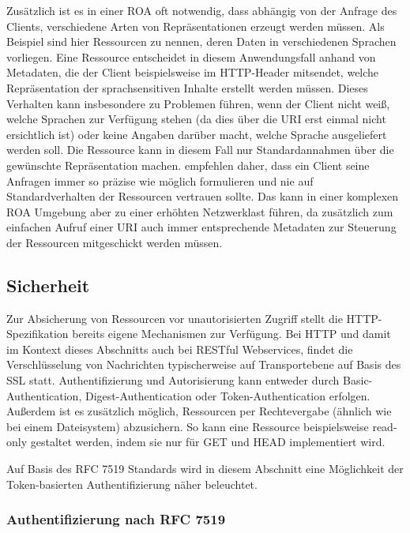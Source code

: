 Zusätzlich ist es in einer \ac{ROA} oft notwendig, dass abhängig von der Anfrage des Clients, verschiedene Arten von Repräsentationen erzeugt werden müssen. Als Beispiel sind hier Ressourcen zu nennen, deren Daten in verschiedenen Sprachen vorliegen. Eine Ressource entscheidet in diesem Anwendungsfall anhand von Metadaten, die der Client beispielsweise im HTTP-Header mitsendet, welche Repräsentation der sprachsensitiven Inhalte erstellt werden müssen. Dieses Verhalten kann insbesondere zu Problemen führen, wenn der Client nicht weiß, welche Sprachen zur Verfügung stehen (da dies über die \ac{URI} erst einmal nicht ersichtlich ist) oder keine Angaben darüber macht, welche Sprache ausgeliefert werden soll. Die Ressource kann in diesem Fall nur Standardannahmen über die gewünschte Repräsentation machen. \citeauthor{Ruby2007} empfehlen daher, dass ein Client seine Anfragen immer so präzise wie möglich formulieren und nie auf Standardverhalten der Ressourcen vertrauen sollte. Das kann in einer komplexen \ac{ROA} Umgebung aber zu einer erhöhten Netzwerklast führen, da zusätzlich zum einfachen Aufruf einer \ac{URI} auch immer entsprechende Metadaten zur Steuerung der Ressourcen mitgeschickt werden müssen. \parencite[vgl.][94]{Ruby2007}

\subsection{Sicherheit}
\label{sec:ROA:Sicherheit}

Zur Absicherung von Ressourcen vor unautorisierten Zugriff stellt die HTTP-Spezifikation bereits eigene Mechanismen zur Verfügung. Bei HTTP und damit im Kontext dieses Abschnitts auch bei RESTful Webservices, findet die Verschlüsselung von Nachrichten typischerweise auf Transportebene auf Basis des \ac{SSL} statt. Authentifizierung und Autorisierung kann entweder durch Basic-Authentication, Digest-Authentication oder Token-Authentication erfolgen. Außerdem ist es zusätzlich möglich, Ressourcen per Rechtevergabe (ähnlich wie bei einem Dateisystem) abzusichern. So kann eine Ressource beispielsweise read-only gestaltet werden, indem sie nur für GET und HEAD implementiert wird. \parencite[vgl.][311\psq]{Ruby2007}

Auf Basis des \ac{RFC} 7519 Standards wird in diesem Abschnitt eine Möglichkeit der Token-basierten Authentifizierung näher beleuchtet.

\subsubsection{Authentifizierung nach \ac{RFC} 7519}

